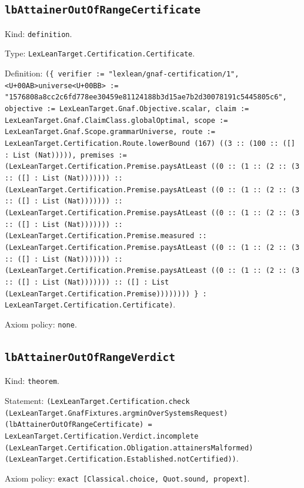 \documentclass[11pt]{article}
\begin{document}
\subsection*{\texttt{lbAttainerOutOfRangeCertificate}}
\noindent Kind: \texttt{definition}.\par
\noindent Type: \texttt{LexLeanTarget.Certification.Certificate}.\par
\noindent Definition: \texttt{(\{ verifier := "lexlean/gnaf-certification/1", <U+00AB>universe<U+00BB> := "1576808a8cc2c6fd778ee30459e81124188b3d15ae7b2d30078191c5445805c6", objective := LexLeanTarget.Gnaf.Objective.scalar, claim := LexLeanTarget.Gnaf.ClaimClass.globalOptimal, scope := LexLeanTarget.Gnaf.Scope.grammarUniverse, route := LexLeanTarget.Certification.Route.lowerBound (167) ((3 :: (100 :: ([] : List (Nat))))), premises := (LexLeanTarget.Certification.Premise.paysAtLeast ((0 :: (1 :: (2 :: (3 :: ([] : List (Nat))))))) :: (LexLeanTarget.Certification.Premise.paysAtLeast ((0 :: (1 :: (2 :: (3 :: ([] : List (Nat))))))) :: (LexLeanTarget.Certification.Premise.paysAtLeast ((0 :: (1 :: (2 :: (3 :: ([] : List (Nat))))))) :: (LexLeanTarget.Certification.Premise.measured :: (LexLeanTarget.Certification.Premise.paysAtLeast ((0 :: (1 :: (2 :: (3 :: ([] : List (Nat))))))) :: (LexLeanTarget.Certification.Premise.paysAtLeast ((0 :: (1 :: (2 :: (3 :: ([] : List (Nat))))))) :: ([] : List (LexLeanTarget.Certification.Premise)))))))) \} : LexLeanTarget.Certification.Certificate)}.\par
\noindent Axiom policy: \texttt{none}.\par
\subsection*{\texttt{lbAttainerOutOfRangeVerdict}}
\noindent Kind: \texttt{theorem}.\par
\noindent Statement: \texttt{(LexLeanTarget.Certification.check (LexLeanTarget.GnafFixtures.argminOverSystemsRequest) (lbAttainerOutOfRangeCertificate) = LexLeanTarget.Certification.Verdict.incomplete (LexLeanTarget.Certification.Obligation.attainersMalformed) (LexLeanTarget.Certification.Established.notCertified))}.\par
\noindent Axiom policy: \texttt{exact [Classical.choice, Quot.sound, propext]}.\par
\end{document}
